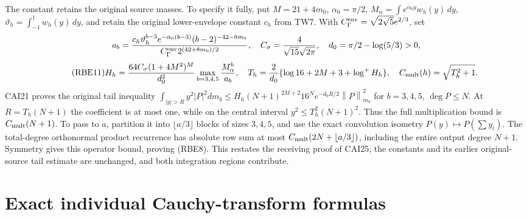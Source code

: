 \documentclass[11pt]{article}
\newcommand{\norm}[1]{\left\lVert#1\right\rVert}
\begin{document}
The constant retains the original source masses. To specify it fully,
put \(M=21+4m_0\), \(\alpha_0=\pi/2\),
\(M_\alpha=\int e^{\alpha_0y}w_h(y)\,dy\),
\(\vartheta_h=\int_{-1}^1w_h(y)\,dy\), and retain the original
lower-envelope constant \(c_h\) from TW7. With
\(C_\Gamma^{\rm env}=\sqrt{2\sqrt5}e^{2/3}\), set
\[
 a_b=\frac{c_h\vartheta_h^{b-3}e^{-\alpha_0(b-3)}
                   (b-2)^{-42-8m_0}}
                  {C_\Gamma^{\rm env}2^{(42+8m_0)/2}},
 \quad C_\sigma=\frac4{\sqrt{15}\sqrt{2\pi}},\quad
 d_0=\pi/2-\log(5/3)>0,
\]
\begin{equation}\tag{RBE11}
 \begin{gathered}
 H_h=\frac{64C_\sigma(1+4M^2)^M}{d_0^2}
                  \max_{b=3,4,5}\frac{M_\alpha^b}{a_b},\quad
 T_h=\frac2{d_0}\{\log16+2M+3+\log^+H_h\},\quad
 C_{\rm mult}(h)=\sqrt{T_h^2+1}.
 \end{gathered}
\end{equation}
CAI21 proves the original tail inequality
\(\int_{|y|>R}y^2|P|^2dm_b
 \le H_h(N+1)^{2M+2}16^Ne^{-d_0R/2}\norm P_{m_b}^2\)
for \(b=3,4,5\), \(\deg P\le N\). At \(R=T_h(N+1)\)
the coefficient is at most one, while on the central interval
\(y^2\le T_h^2(N+1)^2\). Thus the full multiplication bound is
\(C_{\rm mult}(N+1)\). To pass to \(a\), partition it into
\(\lfloor a/3\rfloor\) blocks of sizes \(3,4,5\), and use
the exact convolution isometry \(P(y)\mapsto P(\sum y_i)\).
The total-degree orthonormal product recurrence has absolute row
sum at most \(C_{\rm mult}(2N+\lfloor a/3\rfloor)\), including
the entire output degree \(N+1\). Symmetry gives this operator
bound, proving (RBE8). This restates the receiving proof of CAI25;
the constants and its earlier original-source tail estimate are
unchanged, and both integration regions contribute.

\section{Exact individual Cauchy-transform formulas}
\end{document}
